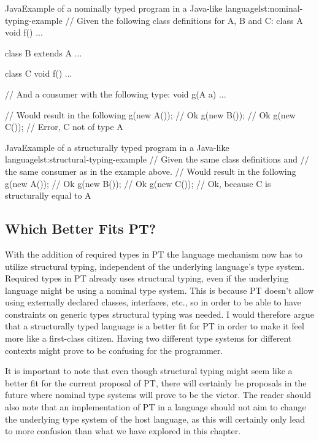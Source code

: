 \begin{code}{Java}{Example of a nominally typed program in a Java-like language}{lst:nominal-typing-example}
    // Given the following class definitions for A, B and C:
    class A {
        void f() {
            ...
        }
    }

    class B extends A {
        ...
    }

    class C {
        void f() {
            ...
        }
    }

    // And a consumer with the following type:
    void g(A a) { ... }

    // Would result in the following
    g(new A()); // Ok
    g(new B()); // Ok
    g(new C()); // Error, C not of type A
\end{code}


\begin{code}{Java}{Example of a structurally typed program in a Java-like language}{lst:structural-typing-example}
    // Given the same class definitions and
    // the same consumer as in the example above.
    // Would result in the following
    g(new A()); // Ok
    g(new B()); // Ok
    g(new C()); // Ok, because C is structurally equal to A
\end{code}

\subsection{Which Better Fits PT?}\label{subsec:which-better-fits-pt?}

With the addition of required types in PT the language mechanism now has to utilize structural typing, independent of the underlying language's type system.
Required types in PT already uses structural typing, even if the underlying language might be using a nominal type system.
This is because PT doesn't allow using externally declared classes, interfaces, etc., so in order to be able to have constraints on generic types structural typing was needed.
I would therefore argue that a structurally typed language is a better fit for PT in order to make it feel more like a first-class citizen.
Having two different type systems for different contexts might prove to be confusing for the programmer.

It is important to note that even though structural typing might seem like a better fit for the current proposal of PT, there will certainly be proposals in the future where nominal type systems will prove to be the victor.
The reader should also note that an implementation of PT in a language should not aim to change the underlying type system of the host language, as this will certainly only lead to more confusion than what we have explored in this chapter.
